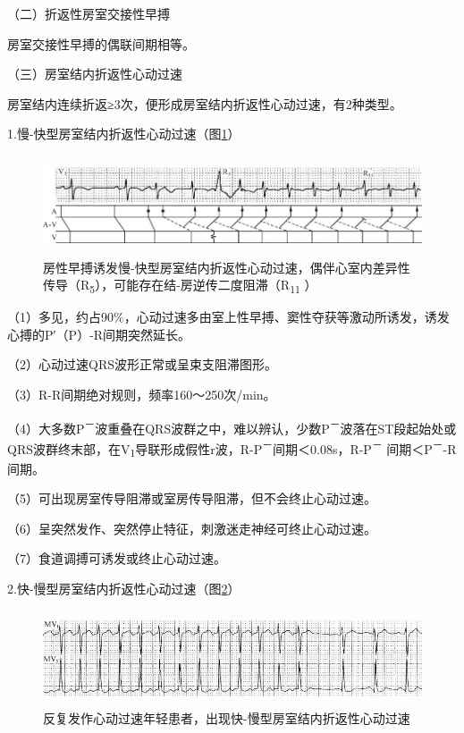 （二）折返性房室交接性早搏

房室交接性早搏的偶联间期相等。

（三）房室结内折返性心动过速

房室结内连续折返≥3次，便形成房室结内折返性心动过速，有2种类型。

1.慢-快型房室结内折返性心动过速（图\ref{fig14-11}）

\begin{figure}[!htbp]
 \centering
 \includegraphics[width=5.79167in,height=1.15625in]{./images/Image00257.jpg}
 \captionsetup{justification=centering}
 \caption{房性早搏诱发慢-快型房室结内折返性心动过速，偶伴心室内差异性传导（R\textsubscript{5}），可能存在结-房逆传二度阻滞（R\textsubscript{11} ）}
 \label{fig14-11}
  \end{figure} 


（1）多见，约占90\%，心动过速多由室上性早搏、窦性夺获等激动所诱发，诱发心搏的P′（P）-R间期突然延长。

（2）心动过速QRS波形正常或呈束支阻滞图形。

（3）R-R间期绝对规则，频率160～250次/min。

（4）大多数P\textsuperscript{－}波重叠在QRS波群之中，难以辨认，少数P\textsuperscript{－}波落在ST段起始处或QRS波群终末部，在V\textsubscript{1}导联形成假性r波，R-P\textsuperscript{－}间期＜0.08s，R-P\textsuperscript{－} 间期＜P\textsuperscript{－}-R间期。

（5）可出现房室传导阻滞或室房传导阻滞，但不会终止心动过速。

（6）呈突然发作、突然停止特征，刺激迷走神经可终止心动过速。

（7）食道调搏可诱发或终止心动过速。

2.快-慢型房室结内折返性心动过速（图\ref{fig14-12}）

\begin{figure}[!htbp]
 \centering
 \includegraphics[width=5.58333in,height=1.11458in]{./images/Image00258.jpg}
 \captionsetup{justification=centering}
 \caption{反复发作心动过速年轻患者，出现快-慢型房室结内折返性心动过速}
 \label{fig14-12}
  \end{figure} 


